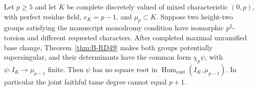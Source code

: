 \begin{proposition}
\label{prop:B-RD50-square}
Let $p\geq5$ and let $K$ be complete discretely valued of mixed
characteristic $(0,p)$, with perfect residue field,
$e_K=p-1$, and $\mu_p\subset K$.
Suppose two height-two groups satisfying the manuscript monodromy
condition have isomorphic $p^2$-torsion and different requested
characters. After completed maximal unramified base change,
Theorem~\ref{thm:B-RD49} makes both groups potentially
supersingular, and their determinants have the common form
$\chi_p\psi$, with $\psi:I_K\to\mu_{p-1}$ finite.
Then $\psi$ has no square root in
$\operatorname{Hom}_{\mathrm{cont}}(I_K,\mu_{p-1})$.
In particular the joint faithful tame degree cannot equal $p+1$.
\end{proposition}
